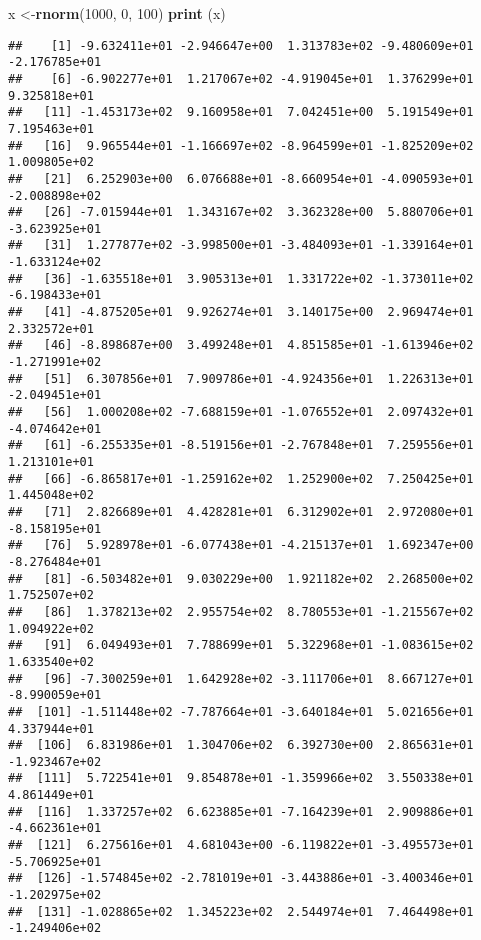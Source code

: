 \documentclass[]{book}
\newenvironment{Shaded}{\begin{snugshade}}{\end{snugshade}}
\newcommand{\DecValTok}[1]{\textcolor[rgb]{0.00,0.00,0.81}{#1}}
\newcommand{\KeywordTok}[1]{\textcolor[rgb]{0.13,0.29,0.53}{\textbf{#1}}}
\newcommand{\NormalTok}[1]{#1}
\begin{document}
\begin{Shaded}
\begin{Highlighting}[]
\NormalTok{x <-}\KeywordTok{rnorm}\NormalTok{(}\DecValTok{1000}\NormalTok{, }\DecValTok{0}\NormalTok{, }\DecValTok{100}\NormalTok{)}
\KeywordTok{print}\NormalTok{ (x)}
\end{Highlighting}
\end{Shaded}

\begin{verbatim}
##    [1] -9.632411e+01 -2.946647e+00  1.313783e+02 -9.480609e+01 -2.176785e+01
##    [6] -6.902277e+01  1.217067e+02 -4.919045e+01  1.376299e+01  9.325818e+01
##   [11] -1.453173e+02  9.160958e+01  7.042451e+00  5.191549e+01  7.195463e+01
##   [16]  9.965544e+01 -1.166697e+02 -8.964599e+01 -1.825209e+02  1.009805e+02
##   [21]  6.252903e+00  6.076688e+01 -8.660954e+01 -4.090593e+01 -2.008898e+02
##   [26] -7.015944e+01  1.343167e+02  3.362328e+00  5.880706e+01 -3.623925e+01
##   [31]  1.277877e+02 -3.998500e+01 -3.484093e+01 -1.339164e+01 -1.633124e+02
##   [36] -1.635518e+01  3.905313e+01  1.331722e+02 -1.373011e+02 -6.198433e+01
##   [41] -4.875205e+01  9.926274e+01  3.140175e+00  2.969474e+01  2.332572e+01
##   [46] -8.898687e+00  3.499248e+01  4.851585e+01 -1.613946e+02 -1.271991e+02
##   [51]  6.307856e+01  7.909786e+01 -4.924356e+01  1.226313e+01 -2.049451e+01
##   [56]  1.000208e+02 -7.688159e+01 -1.076552e+01  2.097432e+01 -4.074642e+01
##   [61] -6.255335e+01 -8.519156e+01 -2.767848e+01  7.259556e+01  1.213101e+01
##   [66] -6.865817e+01 -1.259162e+02  1.252900e+02  7.250425e+01  1.445048e+02
##   [71]  2.826689e+01  4.428281e+01  6.312902e+01  2.972080e+01 -8.158195e+01
##   [76]  5.928978e+01 -6.077438e+01 -4.215137e+01  1.692347e+00 -8.276484e+01
##   [81] -6.503482e+01  9.030229e+00  1.921182e+02  2.268500e+02  1.752507e+02
##   [86]  1.378213e+02  2.955754e+02  8.780553e+01 -1.215567e+02  1.094922e+02
##   [91]  6.049493e+01  7.788699e+01  5.322968e+01 -1.083615e+02  1.633540e+02
##   [96] -7.300259e+01  1.642928e+02 -3.111706e+01  8.667127e+01 -8.990059e+01
##  [101] -1.511448e+02 -7.787664e+01 -3.640184e+01  5.021656e+01  4.337944e+01
##  [106]  6.831986e+01  1.304706e+02  6.392730e+00  2.865631e+01 -1.923467e+02
##  [111]  5.722541e+01  9.854878e+01 -1.359966e+02  3.550338e+01  4.861449e+01
##  [116]  1.337257e+02  6.623885e+01 -7.164239e+01  2.909886e+01 -4.662361e+01
##  [121]  6.275616e+01  4.681043e+00 -6.119822e+01 -3.495573e+01 -5.706925e+01
##  [126] -1.574845e+02 -2.781019e+01 -3.443886e+01 -3.400346e+01 -1.202975e+02
##  [131] -1.028865e+02  1.345223e+02  2.544974e+01  7.464498e+01 -1.249406e+02

\end{verbatim}
\end{document}

